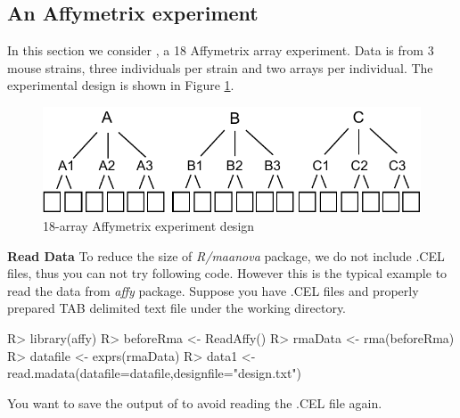 \newpage
\subsection{An Affymetrix experiment}
In this section we consider , a 18 Affymetrix array
experiment. Data is from 3 mouse strains, three individuals per strain and
two arrays per individual. The experimental design is shown in Figure \ref{fig:abf1}.\\
\begin{figure}[htbp]
\centering
\includegraphics{abf1fig.pdf}
\caption{18-array Affymetrix experiment design}
\label{fig:abf1}
\end{figure}
{\bf Read Data} To reduce the size of {\em R/maanova} package, we do not
include .CEL files, thus you can not try following code. However this is the
typical example to read the data from {\em affy} package. Suppose you have .CEL
files and properly prepared TAB delimited text file under the working directory.
\begin{Sinput}
R> library(affy)
R> beforeRma <- ReadAffy()
R> rmaData <- rma(beforeRma)
R> datafile <- exprs(rmaData)
R> data1 <- read.madata(datafile=datafile,designfile="design.txt")
\end{Sinput}
You want to save the output of  to avoid reading the .CEL file again.

